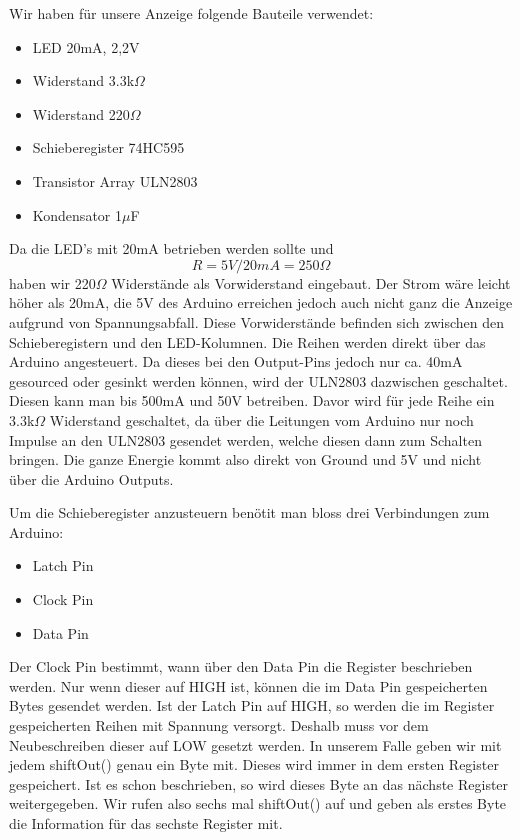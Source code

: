 \documentclass[10pt,a4paper]{article}
\begin{document}
Wir haben für unsere Anzeige folgende Bauteile verwendet:

\begin{itemize}
\item LED 20mA, 2,2V
\item Widerstand 3.3k$\Omega$
\item Widerstand 220$\Omega$
\item Schieberegister 74HC595
\item Transistor Array ULN2803
\item Kondensator 1$\mu$F
\end{itemize}

Da die LED's mit 20mA betrieben werden sollte und  \[R = 5V/20mA = 250\Omega\] haben wir 220$\Omega$ Widerstände als Vorwiderstand eingebaut. Der Strom wäre leicht höher als 20mA, die 5V des Arduino erreichen jedoch auch nicht ganz die Anzeige aufgrund von Spannungsabfall. Diese Vorwiderstände befinden sich zwischen den Schieberegistern und den LED-Kolumnen. Die Reihen werden direkt über das Arduino angesteuert. Da dieses bei den Output-Pins jedoch nur ca. 40mA gesourced oder gesinkt werden können, wird der ULN2803 dazwischen geschaltet. Diesen kann man bis 500mA und 50V betreiben. Davor wird für jede Reihe ein 3.3k$\Omega$ Widerstand geschaltet, da über die Leitungen vom Arduino nur noch Impulse an den ULN2803 gesendet werden, welche diesen dann zum Schalten bringen. Die ganze Energie kommt also direkt von Ground und 5V und nicht über die Arduino Outputs.

Um die Schieberegister anzusteuern benötit man bloss drei Verbindungen zum Arduino:
\begin{itemize}
\item Latch Pin
\item Clock Pin
\item Data Pin
\end{itemize}

Der Clock Pin bestimmt, wann über den Data Pin die Register beschrieben werden. Nur wenn dieser auf HIGH ist, können die im Data Pin gespeicherten Bytes gesendet werden. Ist der Latch Pin auf HIGH, so werden die im Register gespeicherten Reihen mit Spannung versorgt. Deshalb muss vor dem Neubeschreiben dieser auf LOW gesetzt werden. In unserem Falle geben wir mit jedem shiftOut() genau ein Byte mit. Dieses wird immer in dem ersten Register gespeichert. Ist es schon beschrieben, so wird dieses Byte an das nächste Register weitergegeben. Wir rufen also sechs mal shiftOut() auf und geben als erstes Byte die Information für das sechste Register mit.
\end{document}

